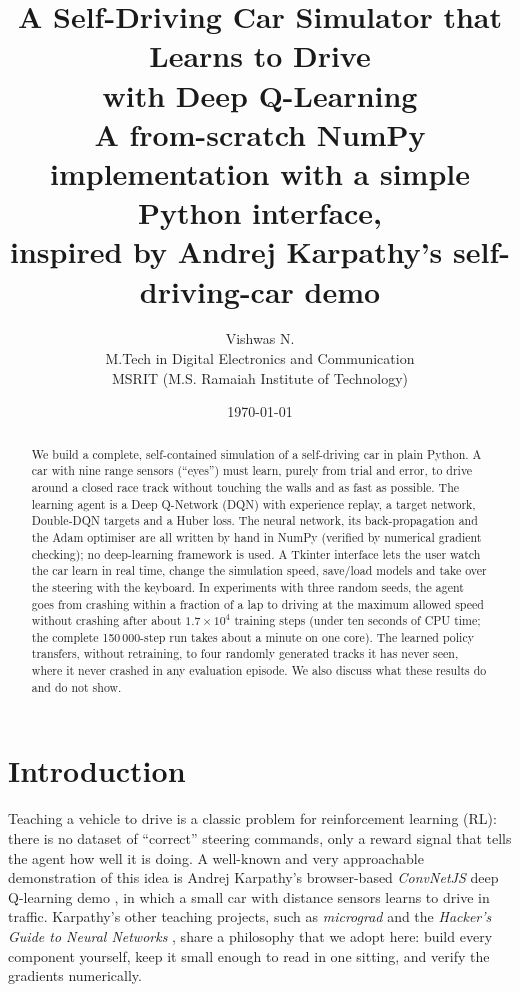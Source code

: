 \documentclass[11pt,a4paper]{article}
\title{\textbf{A Self-Driving Car Simulator that Learns to Drive\\ with Deep Q-Learning}\\[4pt]
\large A from-scratch NumPy implementation with a simple Python interface,\\ inspired by Andrej Karpathy's self-driving-car demo}
\author{Vishwas N.\\[2pt]
\normalsize M.Tech in Digital Electronics and Communication\\
\normalsize MSRIT (M.S. Ramaiah Institute of Technology)}
\date{\today}
\begin{document}
\maketitle

\begin{abstract}
We build a complete, self-contained simulation of a self-driving car in plain Python.
A car with nine range sensors (``eyes'') must learn, purely from trial and error, to drive around a closed race track without touching the walls and as fast as possible.
The learning agent is a Deep Q-Network (DQN) with experience replay, a target network, Double-DQN targets and a Huber loss.
The neural network, its back-propagation and the Adam optimiser are all written by hand in NumPy (verified by numerical gradient checking); no deep-learning framework is used.
A Tkinter interface lets the user watch the car learn in real time, change the simulation speed, save/load models and take over the steering with the keyboard.
In experiments with three random seeds, the agent goes from crashing within a fraction of a lap to driving at the maximum allowed speed without crashing after about \(1.7\times10^{4}\) training steps (under ten seconds of CPU time; the complete 150\,000-step run takes about a minute on one core).
The learned policy transfers, without retraining, to four randomly generated tracks it has never seen, where it never crashed in any evaluation episode.
We also discuss what these results do and do not show.
\end{abstract}

\tableofcontents
\newpage

\section{Introduction}
Teaching a vehicle to drive is a classic problem for reinforcement learning (RL): there is no dataset of ``correct'' steering commands, only a reward signal that tells the agent how well it is doing.
A well-known and very approachable demonstration of this idea is Andrej Karpathy's browser-based \emph{ConvNetJS} deep Q-learning demo \cite{karpathy-rldemo}, in which a small car with distance sensors learns to drive in traffic.
Karpathy's other teaching projects, such as \emph{micrograd} \cite{karpathy-micrograd} and the \emph{Hacker's Guide to Neural Networks} \cite{karpathy-hackers}, share a philosophy that we adopt here: build every component yourself, keep it small enough to read in one sitting, and verify the gradients numerically.
\end{document}
